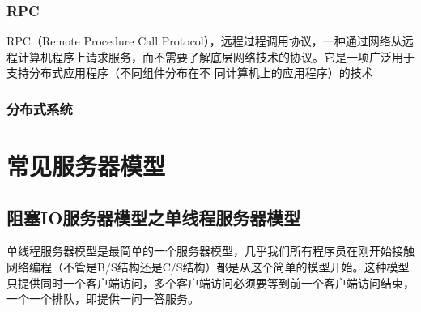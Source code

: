\documentclass[UTF8,a4paper,12pt]{ctexbook}
\begin{document}
		\subsection{RPC}
			RPC（Remote Procedure Call Protocol），远程过程调用协议，一种通过网络从远程计算机程序上请求服务，而不需要了解底层网络技术的协议。它是一项广泛用于支持分布式应用程序（不同组件分布在不 同计算机上的应用程序）的技术
			
		\subsection{分布式系统}
	
	
\chapter{常见服务器模型}
	\section{阻塞IO服务器模型之单线程服务器模型}
		单线程服务器模型是最简单的一个服务器模型，几乎我们所有程序员在刚开始接触网络编程（不管是B/S结构还是C/S结构）都是从这个简单的模型开始。这种模型只提供同时一个客户端访问，多个客户端访问必须要等到前一个客户端访问结束，一个一个排队，即提供一问一答服务。
\end{document}
